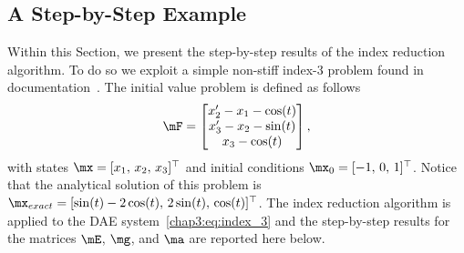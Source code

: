 \subsection{A Step-by-Step Example}
\label{chap3:sec:step_by_step}

Within this Section, we present the step-by-step results of the index reduction algorithm. To do so we exploit a simple non-stiff index-3 problem found in \Wolfram{}~\Mathematica{} documentation~\cite{mathematica}. The initial value problem is defined as follows
%
\begin{equation}
  \label{chap3:eq:index_3}
  \mF = \begin{bmatrix}
    x^{\prime}_{2} - x_{1} - \cos(t) \\
    x^{\prime}_{3} - x_{2} - \sin(t) \\
    x_{3} - \cos(t)
  \end{bmatrix},
\end{equation}
%
with states $\mx = [x_{1}, \, x_{2}, \, x_{3}]^\top$ and initial conditions $\mx_{0} = [-1, \, 0, \, 1]^\top$. Notice that the analytical solution of this problem is $\mx_{exact} = [\sin(t) - 2\cos(t), \, 2\sin(t), \, \cos(t)]^\top$. The index reduction algorithm is applied to the \ac{DAE} system~\eqref{chap3:eq:index_3} and the step-by-step results for the matrices $\mE$, $\mg$, and $\ma$ are reported here below.
%
